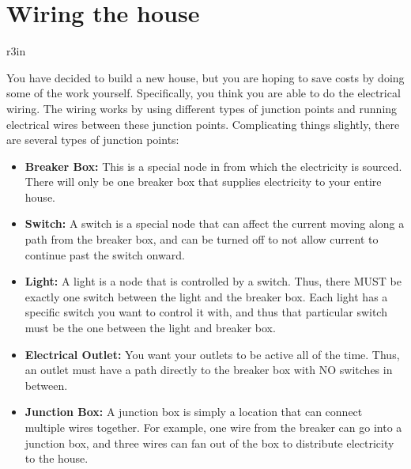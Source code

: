\documentclass[11pt]{article}
\begin{document}
\section*{Wiring the house}


\begin{wrapfigure}{r}{3in}
\vspace{-10pt}
\vspace{-30pt}
\end{wrapfigure}

You have decided to build a new house, but you are hoping to save costs by doing some of the work yourself. Specifically, you think you are able to do the electrical wiring. The wiring works by using different types of junction points and running electrical wires between these junction points. Complicating things slightly, there are several types of junction points:

\begin{itemize}
	\item \textbf{Breaker Box:} This is a special node in from which the electricity is sourced. There will only be one breaker box that supplies electricity to your entire house.
	\item \textbf{Switch:} A switch is a special node that can affect the current moving along a path from the breaker box, and can be turned off to not allow current to continue past the switch onward.
	\item \textbf{Light:} A light is a node that is controlled by a switch. Thus, there MUST be exactly one switch between the light and the breaker box. Each light has a specific switch you want to control it with, and thus that particular switch must be the one between the light and breaker box.
	\item \textbf{Electrical Outlet:} You want your outlets to be active all of the time. Thus, an outlet must have a path directly to the breaker box with NO switches in between.
	\item \textbf{Junction Box:} A junction box is simply a location that can connect multiple wires together. For example, one wire from the breaker can go into a junction box, and three wires can fan out of the box to distribute electricity to the house.
\end{itemize}
\end{document}
